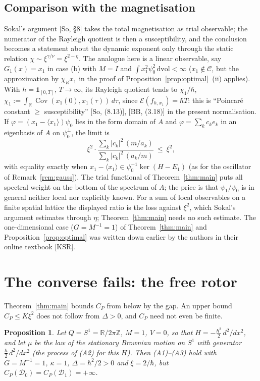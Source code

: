 \documentclass[11pt,a4paper]{article}
\newtheorem{proposition}[theorem]{Proposition}
\theoremstyle{definition}
\theoremstyle{remark}
\newcommand{\R}{\mathbb{R}}
\newcommand{\Cov}{\operatorname{Cov}}
\newcommand{\cE}{\mathcal{E}}
\newcommand{\cD}{\mathcal{D}}
\newcommand{\dvol}{\,\mathrm{dvol}}
\begin{document}
\subsection{Comparison with the magnetisation}

Sokal's argument [So, \S8] takes the total magnetisation as trial observable; the numerator of the Rayleigh quotient is then a susceptibility, and the conclusion becomes a statement about the dynamic exponent only through the static relation $\chi\sim\xi^{\gamma/\nu}=\xi^{2-\eta}$.
The analogue here is a linear observable, say $G_1(x)=x_1$ in case (b) with $M=I$ and $\int x_1^2\psi_0^2\dvol<\infty$ ($x_1\notin\mathcal C$, but the approximation by $\chi_Rx_1$ in the proof of Proposition~\ref{prop:optimal}~(ii) applies).
With $h=\mathbf 1_{[0,T]}$, $T\to\infty$, its Rayleigh quotient tends to $\chi_1/\hbar$, $\chi_1:=\int_\R\Cov(x_1(0),x_1(\tau))\,d\tau$, since $\cE(f_{h,x_1})=\hbar T$: this is ``Poincar\'e constant $\ge$ susceptibility'' [So, (8.13)], [BB, (3.18)] in the present normalisation.
If $\varphi=(x_1-\langle x_1\rangle)\psi_0$ lies in the form domain of $A$ and $\varphi=\sum_kc_ke_k$ in an eigenbasis of $A$ on $\psi_0^\perp$, the limit is
\[
  \xi^2\cdot\frac{\sum_k|c_k|^2\,(m/a_k)}{\sum_k|c_k|^2\,(a_k/m)}\ \le\ \xi^2 ,
\]
with equality exactly when $x_1-\langle x_1\rangle\in\psi_0^{-1}\ker(H-E_1)$ (as for the oscillator of Remark~\ref{rem:gauss}).
The trial functional of Theorem~\ref{thm:main} puts all spectral weight on the bottom of the spectrum of $A$; the price is that $\psi_1/\psi_0$ is in general neither local nor explicitly known.
For a sum of local observables on a finite spatial lattice the displayed ratio is the loss against $\xi^2$, which Sokal's argument estimates through $\eta$; Theorem~\ref{thm:main} needs no such estimate.
The one-dimensional case ($G=M^{-1}=1$) of Theorem~\ref{thm:main} and Proposition~\ref{prop:optimal} was written down earlier by the authors in their online textbook [KSR].

\section{The converse fails: the free rotor}\label{sec:rotor}

Theorem~\ref{thm:main} bounds $C_P$ from below by the gap. An upper bound $C_P\le K\xi^2$ does not follow from $\Delta>0$, and $C_P$ need not even be finite.

\begin{proposition}\label{prop:rotor}
Let $Q=S^1=\R/2\pi\mathbb Z$, $M=1$, $V=0$, so that $H=-\tfrac{\hbar^2}{2}\,d^2/dx^2$, and let $\mu$ be the law of the stationary Brownian motion on $S^1$ with generator $\tfrac{\hbar}{2}\,d^2/dx^2$ (the process of (A2) for this $H$).
Then (A1)--(A3) hold with $G=M^{-1}=1$, $\kappa=1$, $\Delta=\hbar^2/2>0$ and $\xi=2/\hbar$, but $C_P(\cD_0)=C_P(\cD_1)=+\infty$.
\end{proposition}
\end{document}
